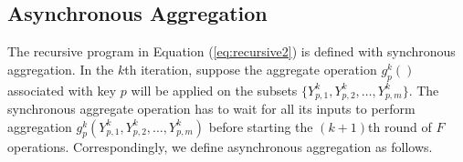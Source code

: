 {%

\subsection{Asynchronous Aggregation}
\label{sec:async:async}

The recursive program in Equation (\ref{eq:recursive2}) is defined with synchronous aggregation. In the $k$th iteration, suppose the aggregate operation $g_{p}^k()$ associated with key $p$ will be applied on the subsets $\{Y_{p,1}^k,Y_{p,2}^k,\ldots,Y_{p,m}^k\}$. The synchronous aggregate operation has to wait for all its inputs to perform aggregation $g_{p}^k(Y_{p,1}^k,Y_{p,2}^k,\ldots,Y_{p,m}^k)$ before starting the $(k+1)$th round of $F$ operations. Correspondingly, we define asynchronous aggregation as follows.


}
